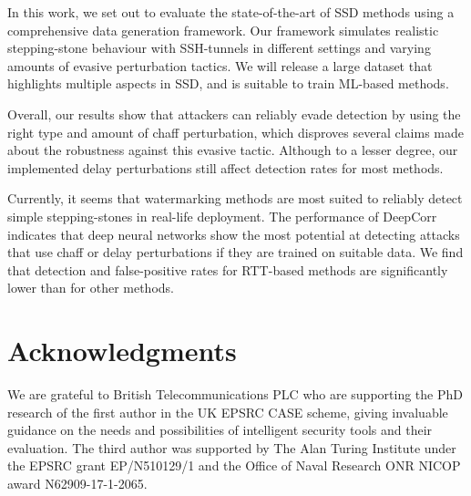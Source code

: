 \documentclass[runningheads,11pt]{llncs}\usepackage[]{graphicx}\usepackage[]{color}
\begin{document}
In this work, we set out to evaluate the state-of-the-art of SSD methods using a comprehensive data generation framework. Our framework simulates realistic stepping-stone behaviour with SSH-tunnels in different  settings and varying amounts of evasive perturbation tactics. 
We will release a large dataset that highlights multiple aspects in SSD, and is suitable to train ML-based methods. 

Overall, our results show that attackers can reliably evade detection by using the right type and amount of chaff perturbation, which disproves several claims made about the robustness against this evasive tactic. Although to a lesser degree, our implemented delay perturbations still affect detection rates for most methods.%

Currently, it seems that watermarking methods are most suited to reliably detect simple stepping-stones in real-life deployment. The performance of DeepCorr indicates that deep neural networks show the most potential at detecting attacks that use chaff or delay perturbations if they are trained on suitable data. We find that detection and false-positive rates for RTT-based methods are significantly lower than for other methods.%

\section{Acknowledgments}

We are grateful to  British Telecommunications PLC who are supporting the PhD research of the first
author in the UK EPSRC CASE scheme, giving invaluable guidance on the needs and possibilities of intelligent security tools and their evaluation. The third author was supported by The Alan Turing Institute under the EPSRC grant EP/N510129/1 and the Office of Naval Research ONR NICOP award N62909-17-1-2065.

\end{document}
